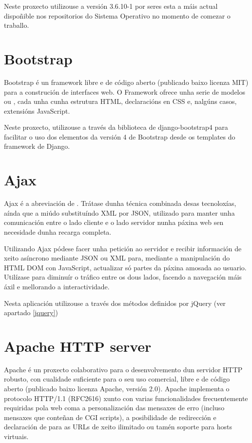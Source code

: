 Neste proxecto utilizouse a versión 3.6.10-1 por seres esta a máis actual dispoñible nos repositorios do Sistema Operativo no momento de comezar o traballo.


\section{Bootstrap}

Bootstrap é un framework libre e de código aberto (publicado baixo licenza MIT) para a construción de interfaces web. O Framework ofrece unha serie de modelos ou , cada unha cunha estrutura HTML, declaracións en CSS e, nalgúns casos, extensións JavaScript.

Neste proxecto, utilizouse a través da biblioteca de django-bootstrap4 para facilitar o uso dos elementos da versión 4 de Bootstrap desde os templates do framework de Django.


\section{Ajax}

Ajax é a abreviación de . Trátase dunha técnica combinada desas tecnoloxías, aínda que a miúdo substituíndo XML por JSON\cite{ajax}, utilizado para manter unha comunicación entre o lado cliente e o lado servidor nunha páxina web sen necesidade dunha recarga completa. 

Utilizando Ajax pódese facer unha petición ao servidor e recibir información de xeito asíncrono mediante JSON ou XML para, mediante a manipulación do HTML DOM con JavaScript, actualizar só partes da páxina amosada ao usuario. Utilízase para diminuír o tráfico entre os dous lados, facendo a navegación máis áxil e mellorando a interactividade.

Nesta aplicación utilizouse a través dos métodos definidos por jQuery (ver apartado \ref{jquery})

\section{Apache HTTP server}

Apache é un proxecto colaborativo para o desenvolvemento dun servidor HTTP robusto, con cualidade suficiente para o seu uso comercial, libre e de código aberto (publicado baixo licenza Apache, versión 2.0\cite{apache}). Apache implementa o protocolo HTTP/1.1 (RFC2616) xunto con varias funcionalidades frecuentemente requiridas pola web coma a personalización das mensaxes de erro (incluso mensaxes que conteñan de CGI scripts), a posibilidade de redirección e declaración de  para as URLs de xeito ilimitado ou tamén soporte para hosts virtuais.

